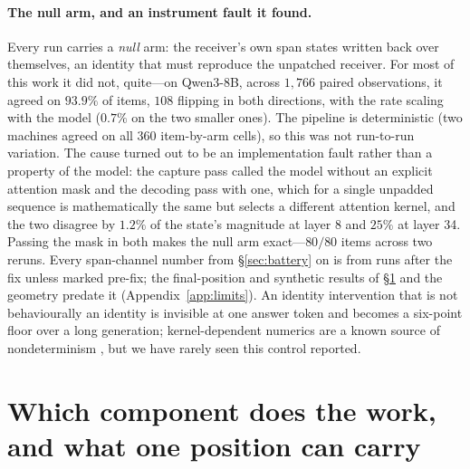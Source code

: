 \documentclass{article}
\begin{document}
\paragraph{The null arm, and an instrument fault it found.} Every run carries a
\emph{null} arm: the receiver's own span states written back over themselves, an
identity that must reproduce the unpatched receiver. For most of this work it
did not, quite---on Qwen3-8B, across $1{,}766$ paired observations, it agreed on
$93.9\%$ of items, $108$ flipping in both directions, with the rate scaling with
the model ($0.7\%$ on the two smaller ones). The pipeline is deterministic (two
machines agreed on all $360$ item-by-arm cells), so this was not run-to-run
variation. The cause turned out to be an implementation fault rather than a
property of the model: the capture pass called the model without an explicit
attention mask and the decoding pass with one, which for a single unpadded
sequence is mathematically the same but selects a different attention kernel,
and the two disagree by $1.2\%$ of the state's magnitude at layer 8 and $25\%$
at layer 34. Passing the mask in both makes the null arm exact---$80/80$ items
across two reruns. Every span-channel number from \S\ref{sec:battery} on is
from runs after the fix unless marked pre-fix; the final-position and synthetic
results of \S\ref{sec:decomp} and the geometry predate it (Appendix~\ref{app:limits}). An identity intervention that
is not behaviourally an identity is invisible at one answer token and becomes a
six-point floor over a long generation; kernel-dependent numerics are a known
source of nondeterminism \citep{he2025nondeterminism}, but we have rarely seen
this control reported.

\section{Which component does the work, and what one position can carry}
\label{sec:decomp}
\end{document}
